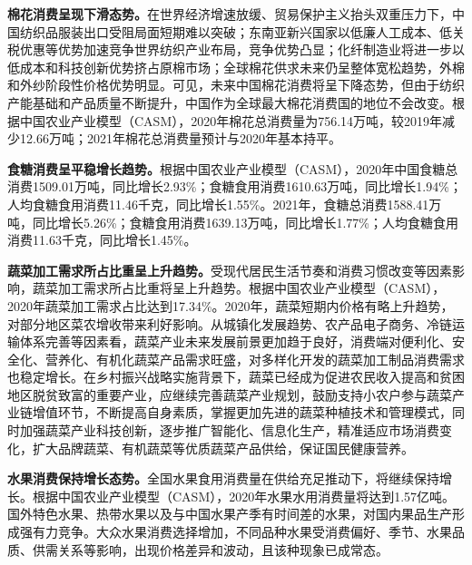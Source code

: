 \documentclass{progbookcn}
\begin{document}
\textbf{棉花消费呈现下滑态势。}在世界经济增速放缓、贸易保护主义抬头双重压力下，中国纺织品服装出口受阻局面短期难以突破；东南亚新兴国家以低廉人工成本、低关税优惠等优势加速竞争世界纺织产业布局，竞争优势凸显；化纤制造业将进一步以低成本和科技创新优势挤占原棉市场；全球棉花供求未来仍呈整体宽松趋势，外棉和外纱阶段性价格优势明显。可见，未来中国棉花消费将呈下降态势，但由于纺织产能基础和产品质量不断提升，中国作为全球最大棉花消费国的地位不会改变。根据中国农业产业模型（CASM），2020年棉花总消费量为756.14万吨，较2019年减少12.66万吨；2021年棉花总消费量预计与2020年基本持平。

\textbf{食糖消费呈平稳增长趋势。}根据中国农业产业模型（CASM），2020年中国食糖总消费1509.01万吨，同比增长2.93\%；食糖食用消费1610.63万吨，同比增长1.94\%；人均食糖食用消费11.46千克，同比增长1.55\%。2021年，食糖总消费1588.41万吨，同比增长5.26\%；食糖食用消费1639.13万吨，同比增长1.77\%；人均食糖食用消费11.63千克，同比增长1.45\%。

\textbf{蔬菜加工需求所占比重呈上升趋势。}受现代居民生活节奏和消费习惯改变等因素影响，蔬菜加工需求所占比重将呈上升趋势。根据中国农业产业模型（CASM），2020年蔬菜加工需求占比达到17.34\%。2020年，蔬菜短期内价格有略上升趋势，对部分地区菜农增收带来利好影响。从城镇化发展趋势、农产品电子商务、冷链运输体系完善等因素看，蔬菜产业未来发展前景更加趋于良好，消费端对便利化、安全化、营养化、有机化蔬菜产品需求旺盛，对多样化开发的蔬菜加工制品消费需求也稳定增长。在乡村振兴战略实施背景下，蔬菜已经成为促进农民收入提高和贫困地区脱贫致富的重要产业，应继续完善蔬菜产业规划，鼓励支持小农户参与蔬菜产业链增值环节，不断提高自身素质，掌握更加先进的蔬菜种植技术和管理模式，同时加强蔬菜产业科技创新，逐步推广智能化、信息化生产，精准适应市场消费变化，扩大品牌蔬菜、有机蔬菜等优质蔬菜产品供给，保证国民健康营养。

\textbf{水果消费保持增长态势。}全国水果食用消费量在供给充足推动下，将继续保持增长。根据中国农业产业模型（CASM），2020年水果水用消费量将达到1.57亿吨。国外特色水果、热带水果以及与中国水果产季有时间差的水果，对国内果品生产形成强有力竞争。大众水果消费选择增加，不同品种水果受消费偏好、季节、水果品质、供需关系等影响，出现价格差异和波动，且该种现象已成常态。
\end{document}
